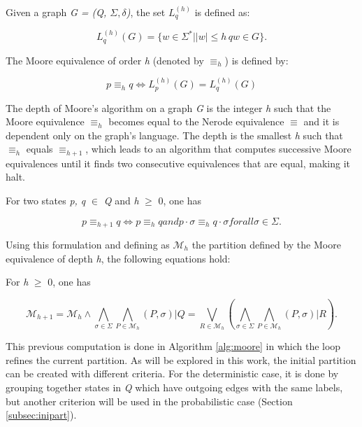 {Given a graph \textit{G = (Q, $\Sigma, \delta$)}, the set $L_q^{(h)}$ is defined as:

\[
L_q^{(h)}(G) = \{w \in \Sigma^* | |w| \leq h\, qw \in G\}.
\]

The Moore equivalence of order \textit{h} (denoted by $\equiv_h$) is defined by:

\[
p \equiv_h q \Leftrightarrow L_p^{(h)}(G) = L_q^{(h)}(G)
\]

The depth of Moore's algorithm on a graph \textit{G} is the integer \textit{h} such that the Moore equivalence $\equiv_h$ becomes equal to the Nerode equivalence $\equiv$ and it is dependent only on the graph's language. The depth is the smallest \textit{h} such that $\equiv_h$ equals $\equiv_{h+1}$, which leads to an algorithm that computes successive Moore equivalences until it finds two consecutive equivalences that are equal, making it halt.

\begin{proposition}\label{prop:makemooreeasy}
For two states \textit{p, q} $\in$ \textit{Q} and \textit{h} $\geq$ 0, one has

\end{proposition}

\[
p \equiv_{h+1} q \Longleftrightarrow p \equiv_{h} q and p\cdot \sigma \equiv_h q\cdot \sigma for all \sigma \in \Sigma.
\]

Using this formulation and defining as $\mathcal{M}_h$ the partition defined by the Moore equivalence of depth \textit{h}, the following equations hold:

\begin{proposition}\label{prop:moorecomp}
For \textit{h} $\geq$ 0, one has

\end{proposition}

\[
\mathcal{M}_{h+1} = \mathcal{M}_h \wedge \bigwedge_{\sigma\in\Sigma} \bigwedge_{P\in\mathcal{M}_h}(P,\sigma)|Q = \bigvee_{R\in\mathcal{M}_h} (\bigwedge_{\sigma\in\Sigma} \bigwedge_{P\in\mathcal{M}_h}(P,\sigma)|R).
\]

This previous computation is done in Algorithm \ref{alg:moore} in which the loop refines the current partition. As will be explored in this work, the initial partition can be created with different criteria. For the deterministic case, it is done by grouping together states in \textit{Q} which have outgoing edges with the same labels, but another criterion will be used in the probabilistic case (Section \ref{subsec:inipart}).

}
